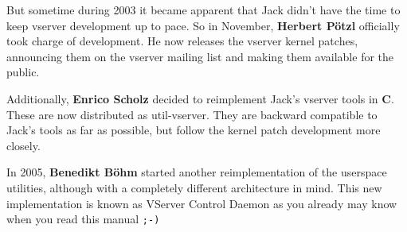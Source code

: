 But sometime during 2003 it became apparent that Jack didn't have the time to
keep vserver development up to pace. So in November, \textbf{Herbert Pötzl}
officially took charge of development. He now releases the vserver kernel
patches, announcing them on the vserver mailing list and making them available
for the public.

Additionally, \textbf{Enrico Scholz} decided to reimplement Jack's vserver
tools in \textbf{C}.  These are now distributed as util-vserver. They are
backward compatible to Jack's tools as far as possible, but follow the kernel
patch development more closely.

In 2005, \textbf{Benedikt Böhm} started another reimplementation of the
userspace utilities, although with a completely different architecture in mind.
This new implementation is known as VServer Control Daemon as you already may
know when you read this manual \texttt{;-)}
